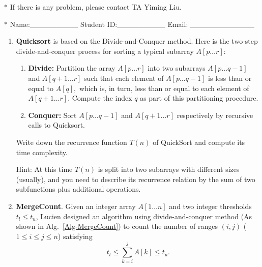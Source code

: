 \documentclass[12pt,a4paper]{article}
\theoremstyle{definition}
\begin{document}
\noindent

\noindent{}
\begin{center}
\footnotesize{\color{red}$*$ If there is any problem, please contact TA Yiming Liu.}

\footnotesize{\color{blue}$*$ Name:\_\_\_\_\_\_\_\_\_  \quad Student ID:\_\_\_\_\_\_\_\_\_ \quad Email: \_\_\_\_\_\_\_\_\_\_\_\_}
\end{center}

\begin{enumerate}
    \item
    \textbf{Quicksort} is based on the Divide-and-Conquer method. Here is the two-step divide-and-conquer process for sorting a typical subarray $A[p \ldots r]$:
    \begin{enumerate}

    	\item
    	\textbf{Divide:} Partition the array $A[p \ldots r]$ into two subarrays $A[p \ldots q-1]$ and $A[q+1 \ldots r]$ such that each element of $A[p \ldots q-1]$ is less than or equal to $A[q],$ which is, in turn, less than or equal to each element of $A[q+1 \ldots r].$ Compute the index $q$ as part of this partitioning procedure.
    	
    	\item
    	\textbf{Conquer:} Sort $A[p \ldots q-1]$ and $A[q+1 \ldots r]$ respectively by recursive calls to Quicksort.
    	
    \end{enumerate}
    Write down the recurrence function $T(n)$ of QuickSort and compute its time complexity.

    {\color{purple}Hint: At this time $T(n)$ is split into two subarrays with different sizes (usually), and you need to describe its recurrence relation by the sum of two subfunctions plus additional operations.}

    \item
    \textbf{MergeCount}. Given an integer array $A[1 \ldots n]$ and two integer thresholds $t_l \le t_u$, Lucien designed an algorithm using divide-and-conquer method (As shown in Alg.~\ref{Alg-MergeCount}) to count the number of ranges $(i,j)$ ($1 \leq i \leq j \leq n$) satisfying
    \begin{equation}\label{Eqn-MergeCount}
    t_l \leq \sum_{k=i}^{j}{A[k]} \leq t_u.
    \end{equation}


\end{enumerate}
\end{document}
